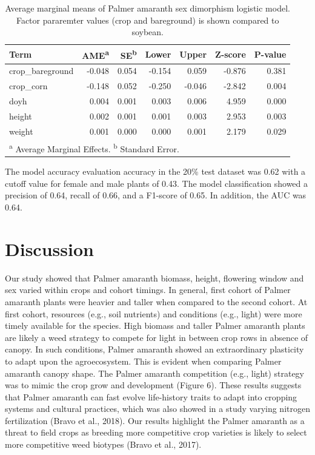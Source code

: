 \documentclass[utf8]{frontiersSCNS}
\begin{document}
\begin{table}[!h]

\caption{\label{tab:unnamed-chunk-3}Average marginal means of Palmer amaranth sex dimorphism logistic model. Factor pararemter values (crop and bareground) is shown compared to soybean.}
\centering
\fontsize{10}{12}\selectfont
\begin{tabular}[t]{lrrrrrr}
\toprule
Term & AME\textsuperscript{a} & SE\textsuperscript{b} & Lower & Upper & Z-score & P-value\\
\midrule
crop\_bareground & -0.048 & 0.054 & -0.154 & 0.059 & -0.876 & 0.381\\

crop\_corn & -0.148 & 0.052 & -0.250 & -0.046 & -2.842 & 0.004\\

doyh & 0.004 & 0.001 & 0.003 & 0.006 & 4.959 & 0.000\\

height & 0.002 & 0.001 & 0.001 & 0.003 & 2.953 & 0.003\\

weight & 0.001 & 0.000 & 0.000 & 0.001 & 2.179 & 0.029\\
\bottomrule
\multicolumn{7}{l}{\rule{0pt}{1em}\textsuperscript{a} Average Marginal Effects. \textsuperscript{b} Standard Error.}\\
\end{tabular}
\end{table}

The model accuracy evaluation accuracy in the 20\% test dataset was 0.62
with a cutoff value for female and male plants of 0.43. The model
classification showed a precision of 0.64, recall of 0.66, and a
F1-score of 0.65. In addition, the AUC was 0.64.

\hypertarget{discussion}{%
\section*{Discussion}\label{discussion}}

Our study showed that Palmer amaranth biomass, height, flowering window
and sex varied within crops and cohort timings. In general, first cohort
of Palmer amaranth plants were heavier and taller when compared to the
second cohort. At first cohort, resources (e.g., soil nutrients) and
conditions (e.g., light) were more timely available for the species.
High biomass and taller Palmer amaranth plants are likely a weed
strategy to compete for light in between crop rows in absence of canopy.
In such conditions, Palmer amaranth showed an extraordinary plasticity
to adapt upon the agroecosystem. This is evident when comparing Palmer
amaranth canopy shape. The Palmer amaranth competition (e.g., light)
strategy was to mimic the crop grow and development (Figure 6). These
results suggests that Palmer amaranth can fast evolve life-history
traits to adapt into cropping systems and cultural practices, which was
also showed in a study varying nitrogen fertilization (Bravo et al.,
2018). Our results highlight the Palmer amaranth as a threat to field
crops as breeding more competitive crop varieties is likely to select
more competitive weed biotypes (Bravo et al., 2017).
\end{document}
